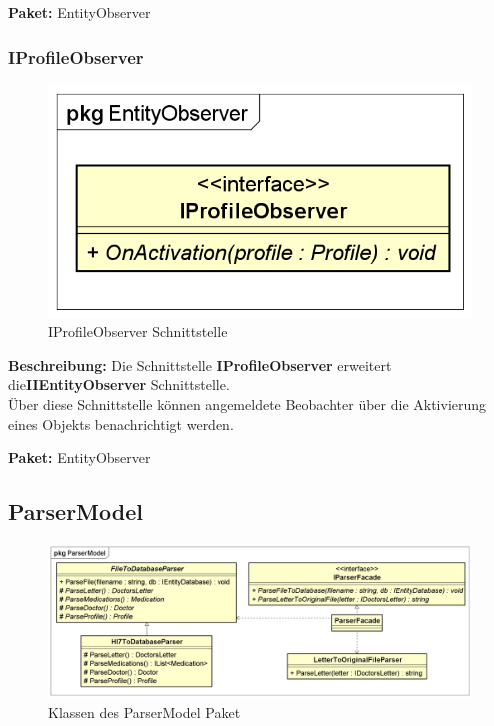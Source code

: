 \documentclass[a4paper]{scrreprt}
\begin{document}
\textbf{Paket:} EntityObserver

\subsubsection{IProfileObserver}
\begin{figure}[H]
\centering
\includegraphics[width=0.45\textheight]{graphics/Klassendiagramme/Model/IProfileObserver.png}
\caption{IProfileObserver Schnittstelle}
\end{figure}
\textbf{Beschreibung:} Die Schnittstelle \textbf{IProfileObserver} erweitert die\textbf{IIEntityObserver} Schnittstelle.\\
Über diese Schnittstelle können angemeldete Beobachter über die Aktivierung eines Objekts benachrichtigt werden.

\textbf{Paket:} EntityObserver

\subsection{ParserModel}
\begin{figure}[H]
\centering
\includegraphics[width=0.75\textheight]{graphics/Klassendiagramme/Model/ParserModelPackage.png}
\caption{Klassen des ParserModel Paket}
\end{figure}
\end{document}
